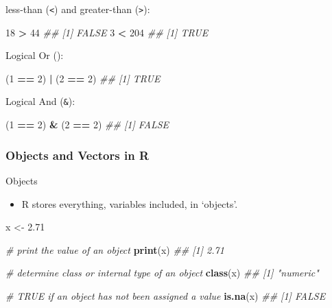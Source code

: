 \documentclass[]{book}
\newenvironment{Shaded}{\begin{snugshade}}{\end{snugshade}}
\newcommand{\CommentTok}[1]{\textcolor[rgb]{0.56,0.35,0.01}{\textit{#1}}}
\newcommand{\DecValTok}[1]{\textcolor[rgb]{0.00,0.00,0.81}{#1}}
\newcommand{\FloatTok}[1]{\textcolor[rgb]{0.00,0.00,0.81}{#1}}
\newcommand{\KeywordTok}[1]{\textcolor[rgb]{0.13,0.29,0.53}{\textbf{#1}}}
\newcommand{\NormalTok}[1]{#1}
\newcommand{\OperatorTok}[1]{\textcolor[rgb]{0.81,0.36,0.00}{\textbf{#1}}}
\newcommand{\StringTok}[1]{\textcolor[rgb]{0.31,0.60,0.02}{#1}}
\providecommand{\tightlist}{%
  \setlength{\itemsep}{0pt}\setlength{\parskip}{0pt}}
\begin{document}
less-than (\texttt{\textless{}}) and greater-than (\texttt{\textgreater{}}):

\begin{Shaded}
\begin{Highlighting}[]
\DecValTok{18} \OperatorTok{>}\StringTok{ }\DecValTok{44}
\CommentTok{## [1] FALSE}
\DecValTok{3} \OperatorTok{<}\StringTok{ }\DecValTok{204}
\CommentTok{## [1] TRUE}
\end{Highlighting}
\end{Shaded}

Logical Or (\texttt{\textbar{}}):

\begin{Shaded}
\begin{Highlighting}[]
\NormalTok{(}\DecValTok{1} \OperatorTok{==}\StringTok{ }\DecValTok{2}\NormalTok{) }\OperatorTok{|}\StringTok{ }\NormalTok{(}\DecValTok{2} \OperatorTok{==}\StringTok{ }\DecValTok{2}\NormalTok{)}
\CommentTok{## [1] TRUE}
\end{Highlighting}
\end{Shaded}

Logical And (\texttt{\&}):

\begin{Shaded}
\begin{Highlighting}[]
\NormalTok{(}\DecValTok{1} \OperatorTok{==}\StringTok{ }\DecValTok{2}\NormalTok{) }\OperatorTok{&}\StringTok{ }\NormalTok{(}\DecValTok{2} \OperatorTok{==}\StringTok{ }\DecValTok{2}\NormalTok{)}
\CommentTok{## [1] FALSE}
\end{Highlighting}
\end{Shaded}

\hypertarget{objects-and-vectors-in-r}{%
\subsubsection*{Objects and Vectors in R}\label{objects-and-vectors-in-r}}

Objects

\begin{itemize}
\tightlist
\item
  R stores everything, variables included, in `objects'.
\end{itemize}

\begin{Shaded}
\begin{Highlighting}[]
\NormalTok{x <-}\StringTok{ }\FloatTok{2.71}

\CommentTok{# print the value of an object}
\KeywordTok{print}\NormalTok{(x)}
\CommentTok{## [1] 2.71}

\CommentTok{# determine class or internal type of an object}
\KeywordTok{class}\NormalTok{(x)}
\CommentTok{## [1] "numeric"}

\CommentTok{# TRUE if an object has not been assigned a value}
\KeywordTok{is.na}\NormalTok{(x)}
\CommentTok{## [1] FALSE}
\end{Highlighting}
\end{Shaded}
\end{document}
